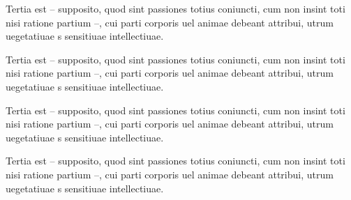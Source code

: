 \documentclass{article}
\begin{document}
\makeatletter















\newcommand{\showwordrank}[2]{%
  #1\textsuperscript{#2}%
}

\begin{ledgroup}

\beginnumbering

\pstart
Tertia est – supposito, quod sint passiones totius coniuncti, cum non insint toti nisi ratione partium –, cui parti corporis uel animae debeant attribui,  utrum uegetatiuae  s  sensitiuae 
intellectiuae.


\pend

\endnumbering
\end{ledgroup}

\begin{pairs}
\begin{Rightside}
\beginnumbering

\pstart
Tertia est – supposito, quod sint passiones totius coniuncti, cum non insint toti nisi ratione partium –, cui parti corporis uel animae debeant attribui,  utrum uegetatiuae  s  sensitiuae 
intellectiuae.


\pend

\endnumbering

\end{Rightside}
  \begin{Leftside}
\beginnumbering

\pstart
Tertia est – supposito, quod sint passiones totius coniuncti, cum non insint toti nisi ratione partium –, cui parti corporis uel animae debeant attribui,  utrum uegetatiuae  s  sensitiuae 
intellectiuae.


\pend

\endnumbering
 

  \end{Leftside}
\end{pairs}
\Columns

\begin{ledgroup}

\beginnumbering

\pstart
Tertia est – supposito, quod sint passiones totius coniuncti, cum non insint toti nisi ratione partium –, cui parti corporis uel animae debeant attribui,  utrum uegetatiuae  s  sensitiuae 
intellectiuae.


\pend

\endnumbering
\end{ledgroup}

\makeatother
\end{document}
